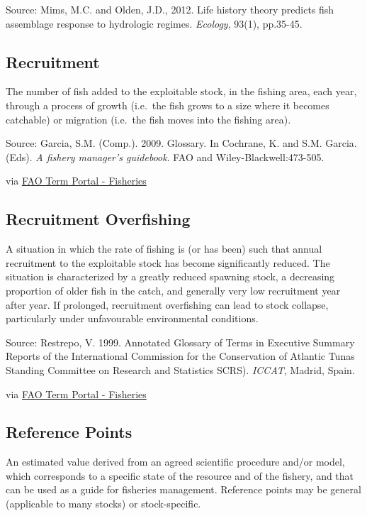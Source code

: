 \documentclass[
  11pt,
]{book}
\begin{document}
Source: Mims, M.C. and Olden, J.D., 2012. Life history theory predicts fish assemblage response to hydrologic regimes. \emph{Ecology}, 93(1), pp.35-45.

\hypertarget{recruitment}{%
\subsection{Recruitment}\label{recruitment}}

The number of fish added to the exploitable stock, in the fishing area, each year, through a process of growth (i.e.~the fish grows to a size where it becomes catchable) or migration (i.e.~the fish moves into the fishing area).

Source: Garcia, S.M. (Comp.). 2009. Glossary. In Cochrane, K. and S.M. Garcia. (Eds). \emph{A fishery manager's guidebook}. FAO and Wiley-Blackwell:473-505.

via \href{http://www.fao.org/fishery/glossary/en}{FAO Term Portal - Fisheries}

\hypertarget{recruitment-overfishing}{%
\subsection{Recruitment Overfishing}\label{recruitment-overfishing}}

A situation in which the rate of fishing is (or has been) such that annual recruitment to the exploitable stock has become significantly reduced. The situation is characterized by a greatly reduced spawning stock, a decreasing proportion of older fish in the catch, and generally very low recruitment year after year. If prolonged, recruitment overfishing can lead to stock collapse, particularly under unfavourable environmental conditions.

Source: Restrepo, V. 1999. Annotated Glossary of Terms in Executive Summary Reports of the International Commission for the Conservation of Atlantic Tunas Standing Committee on Research and Statistics SCRS). \emph{ICCAT}, Madrid, Spain.

via \href{http://www.fao.org/fishery/glossary/en}{FAO Term Portal - Fisheries}

\hypertarget{reference-points}{%
\subsection{Reference Points}\label{reference-points}}

An estimated value derived from an agreed scientific procedure and/or model, which corresponds to a specific state of the resource and of the fishery, and that can be used as a guide for fisheries management. Reference points may be general (applicable to many stocks) or stock-specific.
\end{document}
